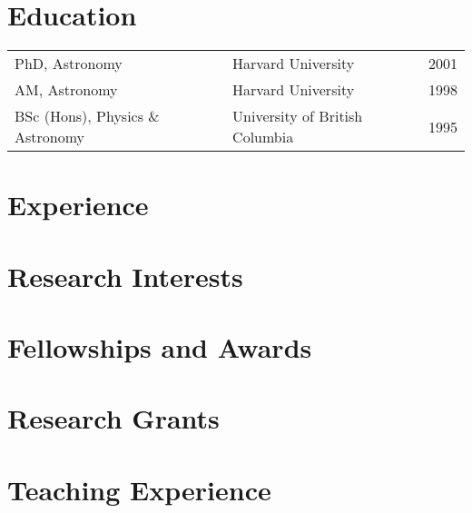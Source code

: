 \documentclass[12pt]{article}
\begin{document}
\maketitle


\vspace{1cm}

\section{Education}
\begin{tabularx}{\textwidth}{lXr}
PhD, Astronomy & Harvard University & 2001\\
AM, Astronomy & Harvard University & 1998\\
BSc (Hons),  Physics \& Astronomy & University of British Columbia&1995\\
\end{tabularx}

\vspace{0.8cm}
\section{Experience} 


\vspace{0.8cm}
\section{Research Interests}


\vspace{0.8cm}
\section{Fellowships and Awards}



\section{Research Grants}




%
\section{Teaching Experience}
\end{document}
